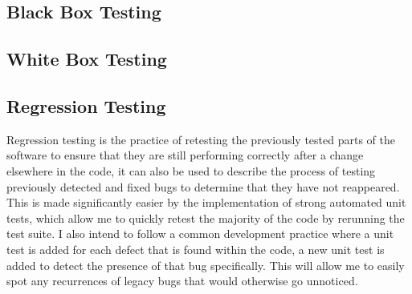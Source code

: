 \subsection{Black Box Testing}

\subsection{White Box Testing}


\subsection{Regression Testing}
Regression testing is the practice of retesting the previously tested parts of the software to ensure that they are still performing correctly after a change elsewhere in the code, it can also be used to describe the process of testing previously detected and fixed bugs to determine that they have not reappeared.
This is made significantly easier by the implementation of strong automated unit tests, which allow me to quickly retest the majority of the code by rerunning the test suite.
I also intend to follow a common development practice where a unit test is added for each defect that is found within the code, a new unit test is added to detect the presence of that bug specifically. 
This will allow me to easily spot any recurrences of legacy bugs that would otherwise go unnoticed.